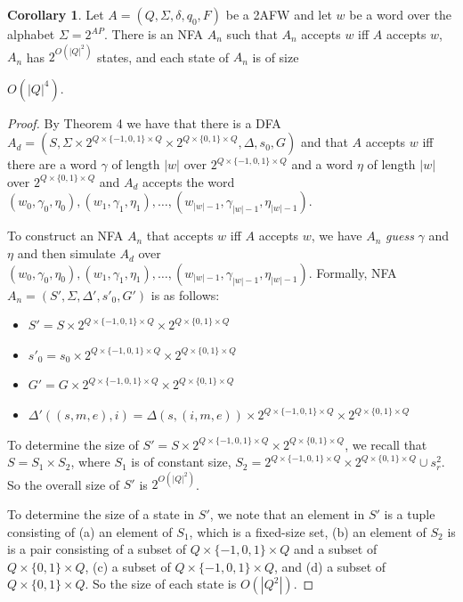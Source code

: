 \documentclass{lmcs}
\theoremstyle{definition}
\DeclareMathOperator{\?}{?}
\newtheorem{corollary}[theorem]{Corollary}
\begin{document}
\begin{corollary}
Let $A= (Q,\Sigma,\delta,q_0,F)$ be a 2AFW and let $w$ be a word over the alphabet $\Sigma = 2^{AP}$. There is an NFA $A_n$
such that $A_n$ accepts $w$ iff $A$ accepts $w$, $A_n$ has $2^{O(|Q|^2)}$ states, and each state of $A_n$ is of size

$O(|Q|^4)$.
\end{corollary}
\begin{proof}



By Theorem 4 we have that there is a DFA $A_d = (S,\Sigma \times 2^{Q \times \{-1,0,1\} \times Q} \times 2^{Q \times \{0,1\} \times Q},\Delta,\allowbreak s_0,G)$ and that $A$ accepts $w$ iff there are a word $\gamma$ of length $|w|$ over $2^{Q \times \{-1,0,1\} \times Q}$ and a word $\eta$ of length $|w|$ over $2^{Q \times \{0,1\} \times Q}$ and $A_d$ accepts the word $(w_0, \gamma_0, \eta_0),(w_1,\gamma_1,\eta_1), \ldots,\allowbreak (w_{|w|-1},\gamma_{|w|-1},\eta_{|w|-1})$.


To construct an NFA $A_n$ that accepts $w$ iff $A$ accepts $w$, we have $A_n$ \emph{guess} $\gamma$ and $\eta$ and then simulate $A_d$ over $(w_0, \gamma_0, \eta_0),(w_1,\gamma_1,\eta_1),\ldots,(w_{|w|-1}, \gamma_{|w|-1},\eta_{|w|-1})$.
Formally, NFA $A_n = (S',\Sigma, \Delta',s'_0,G')$ is as follows:
\begin{itemize}
    \item $S' = S \times 2^{Q \times \{-1,0,1\} \times Q} \times 2^{Q \times \{0,1\} \times Q}$

    \item $s'_0 = s_0 \times 2^{Q \times \{-1,0,1\} \times Q} \times 2^{Q \times \{0,1\} \times Q}$

    \item $G' = G \times 2^{Q \times \{-1,0,1\} \times Q} \times 2^{Q \times \{0,1\} \times Q}$

    \item $\Delta'((s,m,e),i) = \Delta(s,(i,m,e)) \times 2^{Q \times \{-1,0,1\} \times Q} \times 2^{Q \times \{0,1\} \times Q}$
\end{itemize}

To determine the size of $S' = S \times 2^{Q \times \{-1,0,1\} \times Q} \times 2^{Q \times \{0,1\} \times Q}$, we recall that $S = S_1 \times S_2$, where $S_1$ is of constant size, $S_2 = 2^{Q \times \{-1,0,1\} \times Q} \times 2^{Q \times \{0,1\} \times Q} \cup s^2_r$. So the overall size of $S'$ is $2^{O(|Q|^2)}$.

To determine the size of a state in $S'$, we note that an element in $S'$ is a tuple consisting of (a) an element of $S_1$, which is a fixed-size set, (b) an element of $S_2$ is is a pair consisting of a subset of $Q \times \{-1,0,1\} \times Q$ and a subset of  $Q \times \{0,1\} \times Q$, (c) a subset of $Q \times \{-1,0,1\} \times Q$, and (d) a subset of $Q \times \{0,1\} \times Q$. So the size of each state is $O(|Q^2|)$.
\end{proof}
\end{document}
